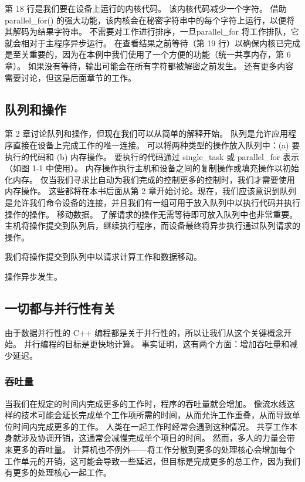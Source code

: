 第 18 行是我们要在设备上运行的内核代码。 该内核代码减少一个字符。 借助parallel\_for() 的强大功能，该内核会在秘密字符串中的每个字符上运行，以便将其解码为结果字符串。 不需要对工作进行排序，一旦parallel\_for 将工作排队，它就会相对于主程序异步运行。 在查看结果之前等待（第 19 行）以确保内核已完成是至关重要的，因为在本例中我们使用了一个方便的功能（统一共享内存，第 6 章）。 如果没有等待，输出可能会在所有字符都被解密之前发生。 还有更多内容需要讨论，但这是后面章节的工作。

\subsection{队列和操作}
第 2 章讨论队列和操作，但现在我们可以从简单的解释开始。 队列是允许应用程序直接在设备上完成工作的唯一连接。 可以将两种类型的操作放入队列中：(a) 要执行的代码和 (b) 内存操作。 要执行的代码通过 single\_task 或 parallel\_for 表示（如图 1-1 中使用）。 内存操作执行主机和设备之间的复制操作或填充操作以初始化内存。 仅当我们寻求比自动为我们完成的控制更多的控制时，我们才需要使用内存操作。 这些都将在本书后面从第 2 章开始讨论。现在，我们应该意识到队列是允许我们命令设备的连接，并且我们有一组可用于放入队列中以执行代码并执行操作的操作。 移动数据。 了解请求的操作无需等待即可放入队列中也非常重要。 主机将操作提交到队列后，继续执行程序，而设备最终将异步执行通过队列请求的操作。

\begin{remark}[队列将我们与设备连接起来]
我们将操作提交到队列中以请求计算工作和数据移动。
	
操作异步发生。
\end{remark}


\subsection{一切都与并行性有关}
由于数据并行性的 C++ 编程都是关于并行性的，所以让我们从这个关键概念开始。 
并行编程的目标是更快地计算。 事实证明，这有两个方面：增加吞吐量和减少延迟。

\subsubsection{吞吐量}
当我们在规定的时间内完成更多的工作时，程序的吞吐量就会增加。 像流水线这样的技术可能会延长完成单个工作项所需的时间，从而允许工作重叠，从而导致单位时间内完成更多的工作。 人类在一起工作时经常会遇到这种情况。 共享工作本身就涉及协调开销，这通常会减慢完成单个项目的时间。 然而，多人的力量会带来更多的吞吐量。 计算机也不例外——将工作分散到更多的处理核心会增加每个工作单元的开销，这可能会导致一些延迟，但目标是完成更多的总工作，因为我们有更多的处理核心一起工作。

